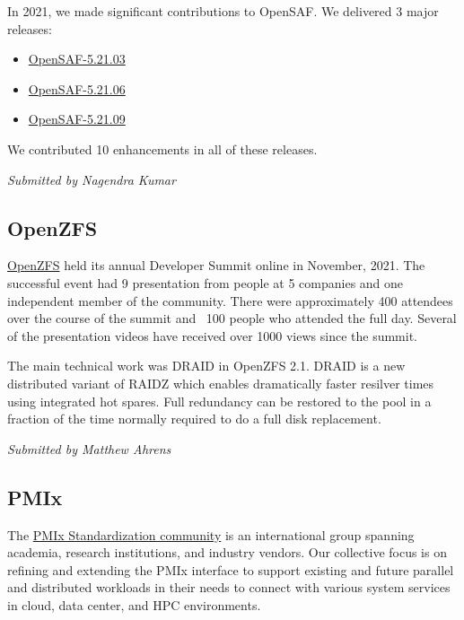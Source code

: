 \documentclass[a4paper]{report}
\begin{document}
In 2021, we made significant contributions to OpenSAF. We delivered 3 major releases:

\begin{itemize}

\item \href{https://sourceforge.net/p/opensaf/wiki/NEWS-5.21.03/}{OpenSAF-5.21.03}

\item \href{https://sourceforge.net/p/opensaf/wiki/NEWS-5.21.06/}{OpenSAF-5.21.06}

\item \href{https://sourceforge.net/p/opensaf/wiki/NEWS-5.21.09/}{OpenSAF-5.21.09}

\end{itemize}

We contributed 10 enhancements in all of these releases.

{\em Submitted by Nagendra Kumar}

\subsection{OpenZFS}

\href{https://openzfs.org/}{OpenZFS} held its annual Developer Summit online in November, 2021. The successful event had 9 presentation from people at 5 companies and one independent member of the community. There were approximately 400 attendees over the course of the summit and ~100 people who attended the full day.  Several of the presentation videos have received over 1000 views since the summit.

The main technical work was DRAID in OpenZFS 2.1. DRAID is a new distributed variant of RAIDZ which enables dramatically faster resilver times using integrated hot spares. Full redundancy can be restored to the pool in a fraction of the time normally required to do a full disk replacement.

{\em Submitted by Matthew Ahrens}

\subsection{PMIx}

The \href{https://pmix.github.io/}{PMIx Standardization community} is an international group spanning academia, research institutions, and industry vendors. Our collective focus is on refining and extending the PMIx interface to support existing and future parallel and distributed workloads in their needs to connect with various system services in cloud, data center, and HPC environments.
\end{document}
